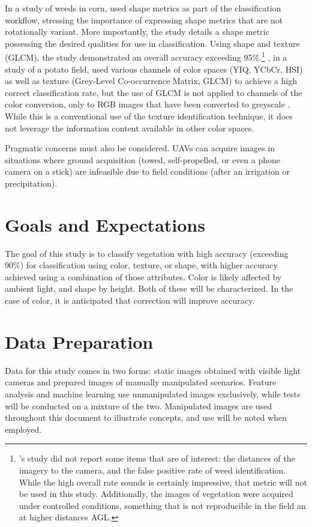 \documentclass[letterpaper]{article}
\begin{document}
In a study of weeds in corn, \citeauthor{Lin2017-xq} used shape metrics as part of the classification workflow, stressing the importance of expressing shape metrics that are not rotationally variant. More importantly, the study details a shape metric possessing the desired qualities for use in classification. Using shape and texture (GLCM), the study demonstrated an overall accuracy exceeding 95\%.\footnote{\citeauthor{Lin2017-xq}'s study did not report some items that are of interest: the distances of the imagery to the camera, and the false positive rate of weed identification. While the high overall rate sounds is certainly impressive, that metric will not be used in this study. Additionally, the images of vegetation were acquired under controlled conditions, something that is not reproducible in the field an at higher distances AGL.} \citeauthor{Sabzi2020-af}, in a study of a potato field, used various channels of color spaces (YIQ, YCbCr, HSI) as well as texture (Grey-Level Co-occurrence Matrix, GLCM) to achieve a high correct classification rate, but the use of GLCM is not applied  to channels of the color conversion, only to RGB images that have been converted to greyscale \parencite{Sabzi2020-af}. While this is a conventional use of the texture identification technique, it does not leverage the information content available in other color spaces.

Pragmatic concerns must also be considered. UAVs can acquire images in situations where ground acquisition (towed, self-propelled, or even a phone camera on a stick) are infeasible due to field conditions (after an irrigation or precipitation).

\section{Goals and Expectations}
The goal of this study is to classify vegetation with high accuracy (exceeding 90\%) for classification using color, texture, or shape, with higher accuracy achieved using a combination of those attributes. Color is likely affected by ambient light, and shape by height. Both of these will be characterized. In the case of color, it is anticipated that correction will improve accuracy.


\section{Data Preparation}
Data for this study comes in two forms: static images obtained with visible light cameras and prepared images of manually manipulated scenarios.  Feature analysis and machine learning use unmanipulated images exclusively, while tests will be conducted on a mixture of the two. Manipulated images are used throughout this document to illustrate concepts, and use will be noted when employed.
\end{document}
